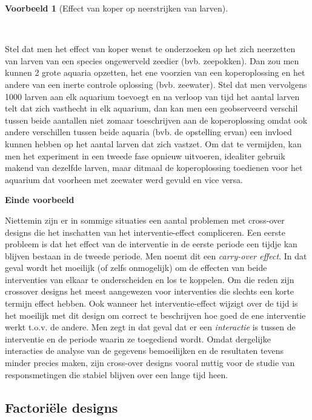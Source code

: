 \documentclass[
  dutch,
  letterpaper,
  12pt]{book}
\theoremstyle{definition}
\theoremstyle{definition}
\theoremstyle{definition}
\newtheorem{example}{Voorbeeld}[chapter]
\theoremstyle{remark}
\begin{document}
\begin{example}[Effect van koper op neerstrijken van
larven]\protect\hypertarget{exm-effect-van-koper-op-neerstrijken-van-larven}{}\label{exm-effect-van-koper-op-neerstrijken-van-larven}

~

\end{example}

Stel dat men het effect van koper wenst te onderzoeken op het zich
neerzetten van larven van een species ongewerveld zeedier (bvb.
zeepokken). Dan zou men kunnen 2 grote aquaria opzetten, het ene
voorzien van een koperoplossing en het andere van een inerte controle
oplossing (bvb. zeewater). Stel dat men vervolgens 1000 larven aan elk
aquarium toevoegt en na verloop van tijd het aantal larven telt dat zich
vasthecht in elk aquarium, dan kan men een geobserveerd verschil tussen
beide aantallen niet zomaar toeschrijven aan de koperoplossing omdat ook
andere verschillen tussen beide aquaria (bvb. de opstelling ervan) een
invloed kunnen hebben op het aantal larven dat zich vastzet. Om dat te
vermijden, kan men het experiment in een tweede fase opnieuw uitvoeren,
idealiter gebruik makend van dezelfde larven, maar ditmaal de
koperoplossing toedienen voor het aquarium dat voorheen met zeewater
werd gevuld en vice versa.

\textbf{Einde voorbeeld}

Niettemin zijn er in sommige situaties een aantal problemen met
cross-over designs die het inschatten van het interventie-effect
compliceren. Een eerste probleem is dat het effect van de interventie in
de eerste periode een tijdje kan blijven bestaan in de tweede periode.
Men noemt dit een \emph{carry-over effect}. In dat geval wordt het
moeilijk (of zelfs onmogelijk) om de effecten van beide interventies van
elkaar te onderscheiden en los te koppelen. Om die reden zijn crossover
designs het meest aangewezen voor interventies die slechts een korte
termijn effect hebben. Ook wanneer het interventie-effect wijzigt over
de tijd is het moeilijk met dit design om correct te beschrijven hoe
goed de ene interventie werkt t.o.v. de andere. Men zegt in dat geval
dat er een \emph{interactie} is tussen de interventie en de periode
waarin ze toegediend wordt. Omdat dergelijke interacties de analyse van
de gegevens bemoeilijken en de resultaten tevens minder precies maken,
zijn cross-over designs vooral nuttig voor de studie van responsmetingen
die stabiel blijven over een lange tijd heen.

\subsection{Factoriële designs}\label{factoriuxeble-designs}
\end{document}

